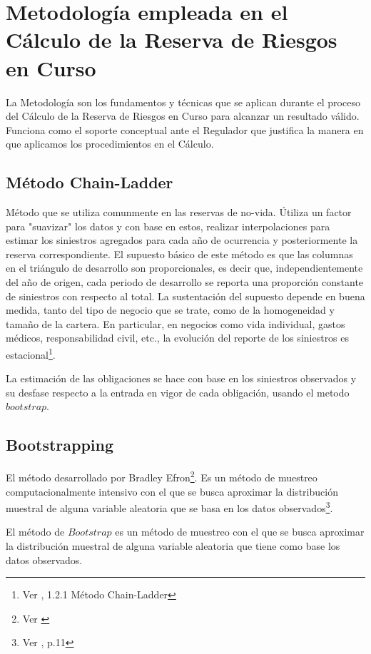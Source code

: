 \documentclass[11pt,twoside,openright,spanish]{report}
\numberwithin{equation}{chapter}
\numberwithin{figure}{chapter}
\numberwithin{table}{chapter}
\begin{document}
	\chapter{Metodología empleada en el Cálculo de la Reserva de Riesgos en Curso}\label{tcyedb}
	
	La Metodología son los fundamentos y técnicas que se aplican durante el proceso del Cálculo de la Reserva de Riesgos en Curso para alcanzar un resultado válido. Funciona como el soporte conceptual ante el Regulador que justifica la manera en que aplicamos los procedimientos en el Cálculo.
	
	\section{Método Chain-Ladder}

	Método que se utiliza comunmente en las reservas de no-vida. Útiliza un factor para "suavizar" los datos y con base en estos, realizar interpolaciones para estimar los siniestros agregados para cada año de ocurrencia y posteriormente la reserva correspondiente. El supuesto básico de este método es que las columnas en el triángulo de desarrollo son proporcionales, es decir que, independientemente del año de origen, cada periodo de desarrollo se reporta una proporción constante de siniestros con respecto al total. La sustentación del supuesto depende en buena medida, tanto del tipo de negocio que se trate, como de la homogeneidad y tamaño de la cartera. En particular, en negocios como vida individual, gastos médicos, responsabilidad civil, etc., la evolución del reporte de los siniestros es estacional\footnote{Ver \citet{LChainLadder}, 1.2.1 Método Chain-Ladder}.  

	La estimación de las obligaciones se hace con base en los siniestros observados y su desfase respecto a la entrada en vigor de cada obligación, usando el metodo $bootstrap$.
	
	\section{Bootstrapping}
	El método desarrollado por Bradley Efron\footnote{Ver \citet{OEfron}}. Es un método de muestreo computacionalmente intensivo con el que se busca aproximar la distribución muestral de alguna variable aleatoria que se basa en los datos observados\footnote{Ver \citet{MBootstrap}, p.11}.

	El método de $Bootstrap$ es un método de muestreo con el que se busca aproximar la distribución muestral de alguna variable aleatoria que tiene como base los datos observados.
\end{document}
